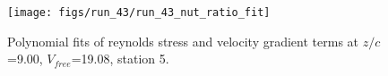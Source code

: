 \begin{figure}[H]
\centering
\texttt{[image: figs/run\_43/run\_43\_nut\_ratio\_fit]}
\caption{Polynomial fits of reynolds stress and velocity gradient terms at $z/c$=9.00, $V_{free}$=19.08, station 5.}
\label{fig:run_43_nut_ratio_fit}
\end{figure}


